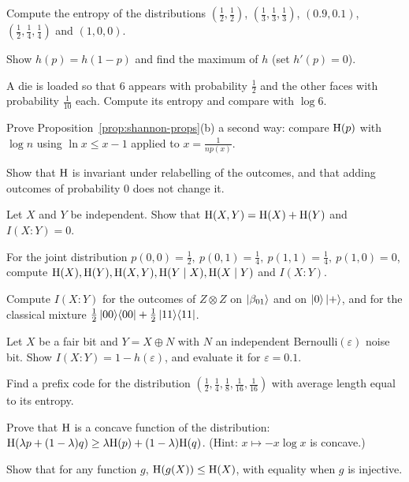 \begin{exerciseset}
   Compute the entropy of the distributions $(\tfrac12,\tfrac12)$, $(\tfrac13,\tfrac13,\tfrac13)$, $(0.9,0.1)$, $(\tfrac12,\tfrac14,\tfrac14)$ and $(1,0,0)$.

   Show $h(p)=h(1-p)$ and find the maximum of $h$ (set $h'(p)=0$).

   A die is loaded so that $6$ appears with probability $\tfrac12$ and the other faces with probability $\tfrac1{10}$ each. Compute its entropy and compare with $\log6$.

   Prove Proposition~\ref{prop:shannon-props}(b) a second way: compare $\mathrm{H}(p)$ with $\log n$ using $\ln x\le x-1$ applied to $x=\frac1{np(x)}$.

   Show that $\mathrm{H}$ is invariant under relabelling of the outcomes, and that adding outcomes of probability $0$ does not change it.

   Let $X$ and $Y$ be independent. Show that $\mathrm{H}(X,Y)=\mathrm{H}(X)+\mathrm{H}(Y)$ and $I(X\!:\!Y)=0$.

  \label{ex:joint-dist} For the joint distribution $p(0,0)=\tfrac12,\ p(0,1)=\tfrac14,\ p(1,1)=\tfrac14,\ p(1,0)=0$, compute $\mathrm{H}(X),\mathrm{H}(Y),\mathrm{H}(X,Y),\mathrm{H}(Y\mid X),\mathrm{H}(X\mid Y)$ and $I(X\!:\!Y)$.

   Compute $I(X\!:\!Y)$ for the outcomes of $Z\otimes Z$ on $\left|\beta_{01}\right\rangle$ and on $\left|0\right\rangle\left|+\right\rangle$, and for the classical mixture $\tfrac12\left|00\right\rangle\!\left\langle00\right|+\tfrac12\left|11\right\rangle\!\left\langle11\right|$.

   Let $X$ be a fair bit and $Y=X\oplus N$ with $N$ an independent Bernoulli$(\varepsilon)$ noise bit. Show $I(X\!:\!Y)=1-h(\varepsilon)$, and evaluate it for $\varepsilon=0.1$.

   Find a prefix code for the distribution $(\tfrac12,\tfrac14,\tfrac18,\tfrac1{16},\tfrac1{16})$ with average length equal to its entropy.

   Prove that $\mathrm{H}$ is a concave function of the distribution: $\mathrm{H}(\lambda p+(1-\lambda)q)\ge\lambda\mathrm{H}(p)+(1-\lambda)\mathrm{H}(q)$. (Hint: $x\mapsto-x\log x$ is concave.)

   Show that for any function $g$, $\mathrm{H}(g(X))\le\mathrm{H}(X)$, with equality when $g$ is injective.
\end{exerciseset}
